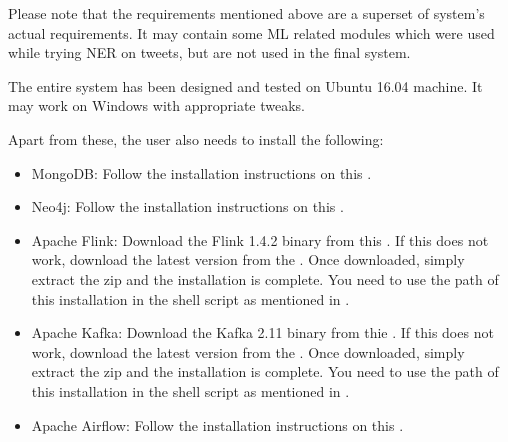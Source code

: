 \documentclass[letterpaper,10pt,english]{sphinxmanual}
\begin{document}
Please note that the requirements mentioned above are a superset of system’s actual requirements. It may contain some ML related modules which were used while trying NER on tweets, but are not used in the final system.

The entire system has been designed and tested on Ubuntu 16.04 machine. It may work on Windows with appropriate tweaks.

Apart from these, the user also needs to install the following:
\begin{itemize}
\item {} 
MongoDB: Follow the installation instructions on this .

\item {} 
Neo4j: Follow the installation instructions on this .

\item {} 
Apache Flink: Download the Flink 1.4.2 binary from this . If this does not work, download the latest version from the . Once downloaded, simply extract the zip and the installation is complete. You need to use the path of this installation in the shell script as mentioned in {\hyperref[\detokenize{running:running-flink-and-kafka}]{}}.

\item {} 
Apache Kafka: Download the Kafka 2.11 binary from thie . If this does not work, download the latest version from the . Once downloaded, simply extract the zip and the installation is complete. You need to use the path of this installation in the shell script as mentioned in {\hyperref[\detokenize{running:running-flink-and-kafka}]{}}.

\item {} 
Apache Airflow: Follow the installation instructions on this .

\end{itemize}
\end{document}
